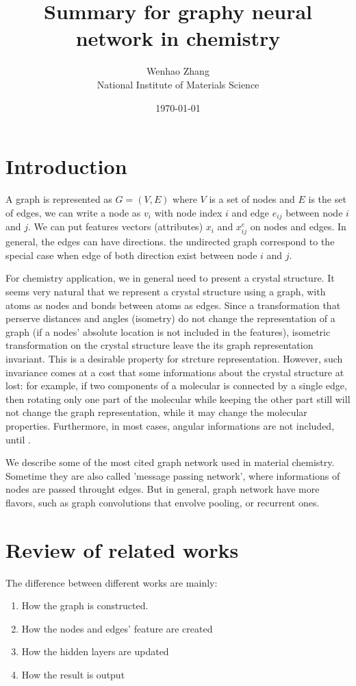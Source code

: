 \documentclass{article}
\begin{document}
\title{Summary for graphy neural network in chemistry}
\author{Wenhao Zhang\\National Institute of Materials Science}
\date{\today}
\maketitle

\section{Introduction}
A graph is represented as $G = (V,E)$ where $V$ is a set of nodes and $E$ is the set of edges\cite{wu_2021}, we can
write a node as $v_i$ with node index $i$ and edge $e_{ij}$ between node $i$ and $j$. 
We can put features vectors (attributes) $x_i$ and $x^e_{ij}$ on nodes and edges. 
In general, the edges can have directions. the undirected graph correspond to the special case when edge of both
direction exist between node $i$ and $j$.

For chemistry application, we in general need to present a crystal structure. 
It seems very natural that we represent a crystal structure using a graph, with atoms as nodes and bonds between atoms 
as edges. 
Since a transformation that perserve distances and angles (isometry) do not change the representation of a graph 
(if a nodes' absolute location is not included in the features), isometric transformation on the crystal structure
leave the its graph representation invariant. This is a desirable property for strcture representation. 
However, such invariance comes at a cost that some informations about the crystal structure at lost: for example, if two 
components of a molecular is connected by a single edge, then rotating only one part of the molecular while keeping the 
other part still will not change the graph representation, while it may change the molecular properties. 
Furthermore, in most cases, angular informations are not included, until \cite{directional_klicpera}. 

We describe some of the most cited graph network used in material chemistry. Sometime they are also called 
'message passing network', where informations of nodes are passed throught edges. But in general, graph network 
have more flavors, such as graph convolutions that envolve pooling, or recurrent ones. 

\section{Review of related works}
The difference between different works are mainly:
\begin{enumerate}
    \item How the graph is constructed.
    \item How the nodes and edges' feature are created
    \item How the hidden layers are updated
    \item How the result is output
\end{enumerate}
\end{document}
